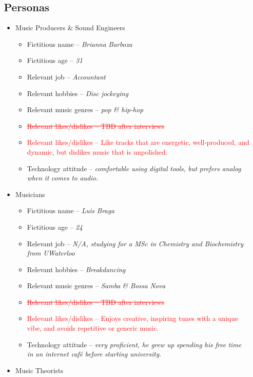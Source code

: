 \documentclass[12pt]{article}
\begin{document}
\subsection{Personas} \label{2.5-personas}
\begin{itemize}
  \item Music Producers \& Sound Engineers
  \begin{itemize}
    \item Fictitious name -- \emph{Brianna Barboza}
    \item Fictitious age -- \emph{31}
    \item Relevant job -- \emph{Accountant}
    \item Relevant hobbies -- \emph{Disc jockeying}
    \item Relevant music genres -- \emph{pop \& hip-hop}
    \item \textcolor{red}{\sout{Relevant likes/dislikes -- TBD after interviews}}
    \item \textcolor{red}{Relevant likes/dislikes -- Like tracks that are energetic, well-produced, and dynamic, but dislikes music that is unpolished.}
    \item Technology attitude -- \emph{comfortable using digital tools, but prefers analog when it comes to audio.}
  \end{itemize}
  \item Musicians
  \begin{itemize}
    \item Fictitious name -- \emph{Luis Braga}
    \item Fictitious age -- \emph{24}
    \item Relevant job -- \emph{N/A, studying for a MSc in Chemistry and Biochemistry from UWaterloo}
    \item Relevant hobbies -- \emph{Breakdancing}
    \item Relevant music genres -- \emph{Samba \& Bossa Nova}
    \item \textcolor{red}{\sout{Relevant likes/dislikes -- TBD after interviews}}
    \item \textcolor{red}{Relevant likes/dislikes -- Enjoys creative, inspiring tunes with a unique vibe, and avoids repetitive or generic music.}
    \item Technology attitude --  \emph{very proficient, he grew up spending his free time in an internet café before starting university.}
  \end{itemize}
  \item Music Theorists
  \begin{itemize}

\end{itemize}
\end{itemize}
\end{document}

